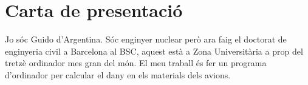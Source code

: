 \documentclass[a4paper,12pt,twoside]{book}
\begin{document}
\chapter*{Carta de presentació}

Jo s\'oc Guido d'Argentina. S\'oc enginyer nuclear per\`o ara faig 
el doctorat de enginyeria civil a Barcelona al BSC, aquest est\`a 
a Zona Universit\`aria a prop del tretz\`e ordinador mes gran del 
m\'on. El meu traball és fer un programa d'ordinador 
per calcular el dany en els materials dels avions.
\end{document}
